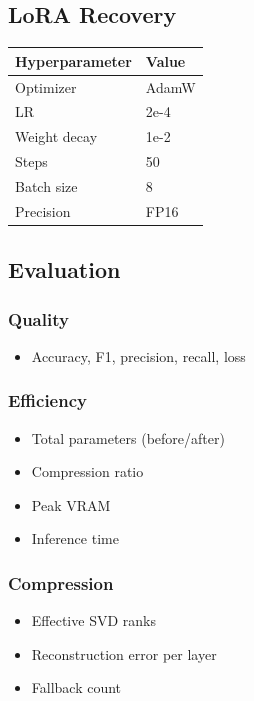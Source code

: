 \subsection{LoRA Recovery}

\begin{table}[H]
\centering
\small
\begin{tabular}{ll}
\toprule
\textbf{Hyperparameter} & \textbf{Value} \\
\midrule
Optimizer & AdamW \\
LR & 2e-4 \\
Weight decay & 1e-2 \\
Steps & 50 \\
Batch size & 8 \\
Precision & FP16 \\
\bottomrule
\end{tabular}
\end{table}

\subsection{Evaluation}

\subsubsection{Quality}
\begin{itemize}
\item Accuracy, F1, precision, recall, loss

\end{itemize}
\subsubsection{Efficiency}
\begin{itemize}
\item Total parameters (before/after)
\item Compression ratio
\item Peak VRAM
\item Inference time

\end{itemize}
\subsubsection{Compression}
\begin{itemize}
\item Effective SVD ranks
\item Reconstruction error per layer
\item Fallback count

\end{itemize}

